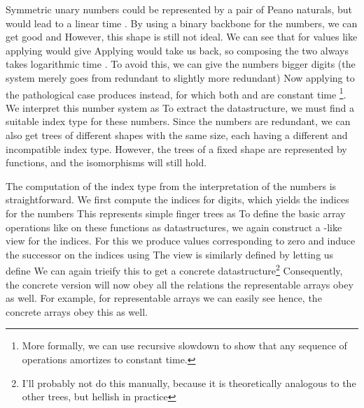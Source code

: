 Symmetric unary numbers could be represented by a pair of Peano naturals, but would lead to a linear time . 
By using a binary backbone for the numbers, we can get good  and 
However, this shape is still not ideal. We can see that for values like
applying  would give
Applying  would take us back, so composing the two always takes logarithmic time \cite{ftanew}. To avoid this, we can give the numbers bigger digits (the system merely goes from redundant to slightly more redundant)
Now applying  to the pathological case
produces
instead, for which both  and  are constant time \footnote{More formally, we can use recursive slowdown \cite{purelyfunctional,recursiveslowdown} to show that any sequence of operations amortizes to constant time.}. We interpret this number system as
To extract the datastructure, we must find a suitable index type for these numbers. Since the numbers are redundant, we can also get trees of different shapes with the same size, each having a different and incompatible index type. However, the trees of a fixed shape are represented by functions, and the isomorphisms will still hold.

The computation of the index type from the interpretation of the numbers is straightforward. We first compute the indices for digits, which yields the indices for the numbers
This represents simple finger trees as
To define the basic array operations like  on these functions as datastructures, we again construct a -like view for the indices. For this we produce values corresponding to zero
and induce the successor on the indices using
The view is similarly defined by
letting us define
We can again trieify this to get a concrete datastructure\footnote{I'll probably not do this manually, because it is theoretically analogous to the other trees, but hellish in practice}
Consequently, the concrete version will now obey all the relations the representable arrays obey as well. For example, for representable arrays we can easily see 
hence, the concrete arrays obey this as well.

